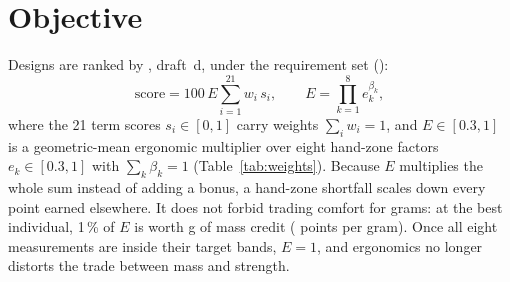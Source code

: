 \section{Objective}\label{sec:objective}
Designs are ranked by , draft~d, under the requirement set 
():
\begin{equation}
\mathrm{score} = 100\,E \sum_{i=1}^{21} w_i\,s_i, \qquad E = \prod_{k=1}^{8} e_k^{\beta_k},
\end{equation}
where the 21 term scores $s_i \in [0,1]$ carry weights $\sum_i w_i = 1$, and $E \in [0.3, 1]$ is a geometric-mean
ergonomic multiplier over eight hand-zone factors $e_k \in [0.3, 1]$ with $\sum_k \beta_k = 1$ (Table~\ref{tab:weights}).
Because $E$ multiplies the whole sum instead of adding a bonus, a hand-zone shortfall scales down every point earned
elsewhere. It does not forbid trading comfort for grams: at the best individual, 1\,\% of $E$ is worth \gGramsPerPctE{} g
of mass credit (\gPtsPerGram{} points per gram). Once all eight measurements are inside their target bands, $E = 1$,
and ergonomics no longer distorts the trade between mass and strength.

